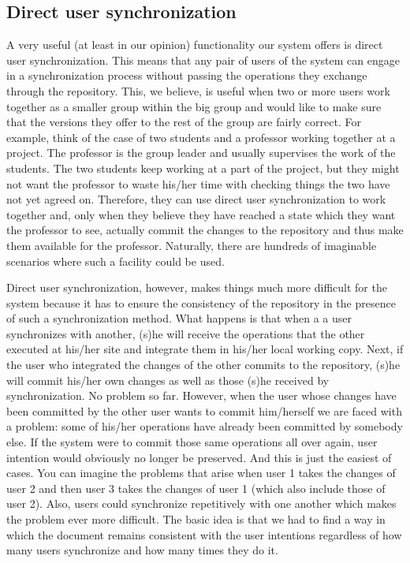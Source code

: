 \subsection{Direct user synchronization}
\label{sec:synch}

A very useful (at least in our opinion) functionality our system offers is direct user synchronization.
This means that any pair of users of the system can engage in a synchronization process without passing
the operations they exchange through the repository. This, we believe, is useful when two or more users
work together as a smaller group within the big group and would like to make sure that the versions they
offer to the rest of the group are fairly correct. For example, think of the case of two students and a
professor working together at a project. The professor is the group leader and usually supervises the
work of the students. The two students keep working at a part of the project, but they might not want
the professor to waste his/her time with checking things the two have not yet agreed on. Therefore, they
can use direct user synchronization to work together and, only when they believe they have reached a
state which they want the professor to see, actually commit the changes to the repository and thus
make them available for the professor. Naturally, there are hundreds of imaginable scenarios where such
a facility could be used.

Direct user synchronization, however, makes things much more difficult for the system because it has to
ensure the consistency of the repository in the presence of such a synchronization method. What happens
is that when a a user synchronizes with another, (s)he will receive the operations that the other executed
at his/her site and integrate them in his/her local working copy. Next, if the user who integrated the
changes of the other commits to the repository, (s)he will commit his/her own changes as well as those
(s)he received by synchronization. No problem so far. However, when the user whose changes have been
committed by the other user wants to commit him/herself we are faced with a problem: some of his/her
operations have already been committed by somebody else. If the system were to commit those same operations
all over again, user intention would obviously no longer be preserved. And this is just the easiest of
cases. You can imagine the problems that arise when user 1 takes the changes of user 2 and then user 3
takes the changes of user 1 (which also include those of user 2). Also, users could synchronize
repetitively with one another which makes the problem ever more difficult. The basic idea is that we
had to find a way in which the document remains consistent with the user intentions regardless of how
many users synchronize and how many times they do it.

